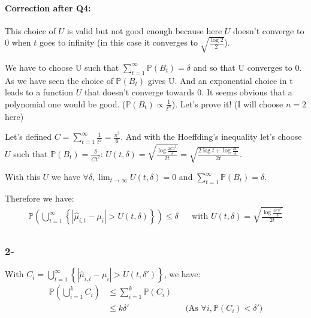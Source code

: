 \documentclass[a4paper]{article}
\newcommand{\wh}[1]{\widehat{#1}}
\begin{document}
\paragraph*{Correction after Q4:}
This choice of $U$ is valid but not good enough because here $U$ doesn't converge to 0 when $t$ goes to infinity (in this case it converges to
$\sqrt{\frac{\log2}{2}}$).


We have to choose U such that
$\sum_{t=1}^\infty \mathbb{P}(B_t) = \delta$ and so that U converges to 0. As we have seen the choice of $\mathbb{P}(B_t)$ gives U.
And an exponential choice in t leads to a function $U$ that doesn't converge towards 0. It seems obvious that a polynomial one would be good.
($\mathbb{P}(B_t) \propto \frac{1}{t^n}$). Let's prove it! (I will choose $n=2$ here)

Let's defined $C = \sum_{t=1}^\infty \frac{1}{t^2} = \frac{\pi^2}{6}$. And with the Hoeffding's inequality let's choose $U$ such that
$\mathbb{P}(B_t) = \frac{\delta}{Ct^2}$:
$U(t, \delta) = \sqrt{\frac{\log\frac{2Ct^2}{\delta}}{2t}} =  \sqrt{\frac{2\log t + \log\frac{2C}{\delta}}{2t}}$.

With this $U$ we have $\forall \delta, \lim_{t\rightarrow\infty} U(t, \delta) = 0$ and $\sum_{t=1}^{\infty} \mathbb{P}(B_t) = \delta$.

Therefore we have:
\begin{equation*}
    \begin{aligned}
        \mathbb{P}\left(\bigcup_{t=1}^{\infty} \left\{ | \wh{\mu}_{i,t} - \mu_i | > U(t,\delta)\right\} \right)  \leq \delta &  & \text{with } \boxed{U(t, \delta) = \sqrt{\frac{\log\frac{2Ct^2}{\delta}}{2t}}} \\
    \end{aligned}
\end{equation*}

\subsubsection*{2-}
With $C_i = \bigcup_{t=1}^{\infty} \left\{ | \wh{\mu}_{i,t} - \mu_i | > U(t,\delta')\right\}$, we have:
\begin{equation*}
    \begin{aligned}
        \mathbb{P}\left(\bigcup_{i=1}^{k}C_i\right) & \le \sum_{i=1}^k \mathbb{P}\left( C_i \right)                                                         \\
                                                    & \le k\delta'                                  &  & \text{(As $\forall i, \mathbb{P}(C_i) < \delta'$)} \\
    \end{aligned}
\end{equation*}
\end{document}
